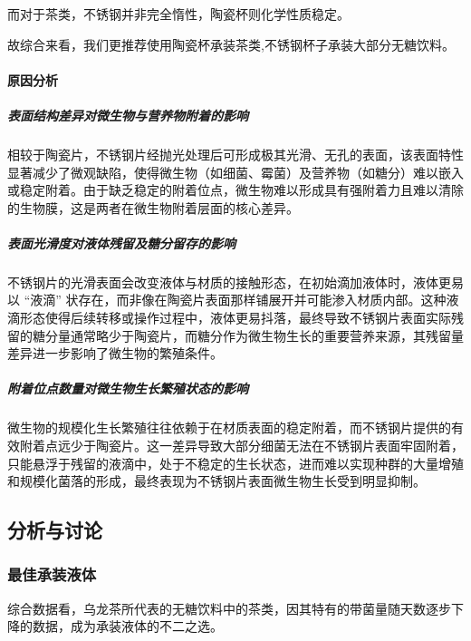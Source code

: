 \documentclass[12pt,a4paper]{ctexart}
\begin{document}
而对于茶类，不锈钢并非完全惰性，陶瓷杯则化学性质稳定。

故综合来看，我们更推荐使用陶瓷杯承装茶类,不锈钢杯子承装大部分无糖饮料。

\paragraph{原因分析}
\subparagraph{表面结构差异对微生物与营养物附着的影响}
相较于陶瓷片，不锈钢片经抛光处理后可形成极其光滑、无孔的表面，该表面特性显著减少了微观缺陷，使得微生物（如细菌、霉菌）及营养物（如糖分）难以嵌入或稳定附着。由于缺乏稳定的附着位点，微生物难以形成具有强附着力且难以清除的生物膜，这是两者在微生物附着层面的核心差异。
\subparagraph{表面光滑度对液体残留及糖分留存的影响}
不锈钢片的光滑表面会改变液体与材质的接触形态，在初始滴加液体时，液体更易以 “液滴” 状存在，而非像在陶瓷片表面那样铺展开并可能渗入材质内部。这种液滴形态使得后续转移或操作过程中，液体更易抖落，最终导致不锈钢片表面实际残留的糖分量通常略少于陶瓷片，而糖分作为微生物生长的重要营养来源，其残留量差异进一步影响了微生物的繁殖条件。
\subparagraph{附着位点数量对微生物生长繁殖状态的影响}
微生物的规模化生长繁殖往往依赖于在材质表面的稳定附着，而不锈钢片提供的有效附着点远少于陶瓷片。这一差异导致大部分细菌无法在不锈钢片表面牢固附着，只能悬浮于残留的液滴中，处于不稳定的生长状态，进而难以实现种群的大量增殖和规模化菌落的形成，最终表现为不锈钢片表面微生物生长受到明显抑制。

\subsection{分析与讨论}
\subsubsection{最佳承装液体}
综合数据看，乌龙茶所代表的无糖饮料中的茶类，因其特有的带菌量随天数逐步下降的数据，成为承装液体的不二之选。
\end{document}
